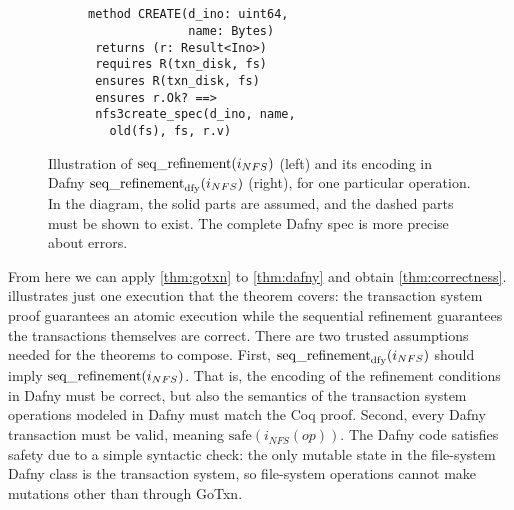 \begin{figure}
  \begin{subfigure}{0.18\textwidth}
    
  \end{subfigure}~~~\vrule~~~~%
\begin{subfigure}{0.2\textwidth}
  {\small
\begin{verbatim}

method CREATE(d_ino: uint64,
              name: Bytes)
 returns (r: Result<Ino>)
 requires R(txn_disk, fs)
 ensures R(txn_disk, fs)
 ensures r.Ok? ==>
 nfs3create_spec(d_ino, name,
   old(fs), fs, r.v)
\end{verbatim}
}
\end{subfigure}
  \caption{Illustration of $\operatorname{seq\_refinement}(i_{NFS})$ (left) and its encoding
in Dafny $\operatorname{seq\_refinement}_{\mathrm{dfy}}(i_{NFS})$ (right), for one particular operation.
In the diagram, the solid parts are assumed, and the
dashed parts must be shown to exist. The complete Dafny spec is more precise about
errors.}
  \label{fig:refinement}
\end{figure}

From here we can apply \cref{thm:gotxn} to \cref{thm:dafny} and
obtain \cref{thm:correctness}.  illustrates
just one execution that the theorem covers: the transaction system proof guarantees an
atomic execution while the sequential refinement guarantees the transactions
themselves are correct. There are two trusted assumptions needed for the
theorems to compose. First, $\operatorname{seq\_refinement}_{\mathrm{dfy}}(i_{NFS})$ should imply
$\operatorname{seq\_refinement}(i_{NFS})$. That is, the encoding of the refinement
conditions in Dafny must be correct, but also the semantics of the transaction
system operations modeled in Dafny must match the Coq proof. Second, every Dafny
transaction must be valid, meaning $\mathrm{safe}(i_{NFS}(op))$. The Dafny code
satisfies safety due to a simple syntactic check: the only mutable state in the
file-system Dafny class is the transaction system, so file-system operations
cannot make mutations other than through GoTxn.

